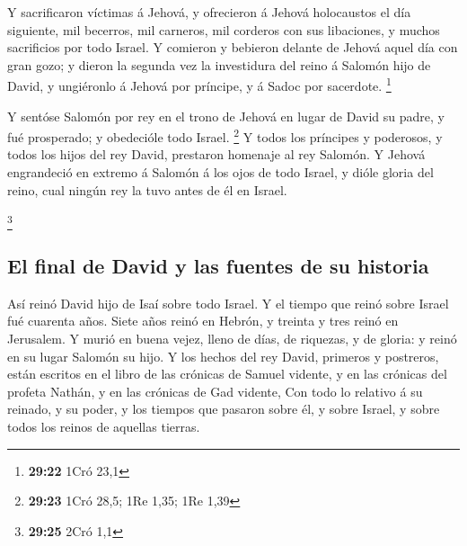  Y sacrificaron víctimas á Jehová, y ofrecieron á Jehová
holocaustos el día siguiente, mil becerros, mil carneros, mil corderos
con sus libaciones, y muchos sacrificios por todo Israel. 
Y comieron y bebieron delante de Jehová aquel día con gran gozo; y
dieron la segunda vez la investidura del reino á Salomón hijo de David,
y ungiéronlo á Jehová por príncipe, y á Sadoc por sacerdote. \footnote{\textbf{29:22}
  1Cró 23,1}

 Y sentóse Salomón por rey en el trono de Jehová en lugar
de David su padre, y fué prosperado; y obedecióle todo Israel.
\footnote{\textbf{29:23} 1Cró 28,5; 1Re 1,35; 1Re 1,39}  Y
todos los príncipes y poderosos, y todos los hijos del rey David,
prestaron homenaje al rey Salomón.  Y Jehová engrandeció en
extremo á Salomón á los ojos de todo Israel, y dióle gloria del reino,
cual ningún rey la tuvo antes de él en Israel.

\footnote{\textbf{29:25} 2Cró 1,1}

\hypertarget{el-final-de-david-y-las-fuentes-de-su-historia}{%
\subsection{El final de David y las fuentes de su
historia}\label{el-final-de-david-y-las-fuentes-de-su-historia}}

 Así reinó David hijo de Isaí sobre todo Israel.
 Y el tiempo que reinó sobre Israel fué cuarenta años.
Siete años reinó en Hebrón, y treinta y tres reinó en Jerusalem.
 Y murió en buena vejez, lleno de días, de riquezas, y de
gloria: y reinó en su lugar Salomón su hijo.  Y los hechos
del rey David, primeros y postreros, están escritos en el libro de las
crónicas de Samuel vidente, y en las crónicas del profeta Nathán, y en
las crónicas de Gad vidente,  Con todo lo relativo á su
reinado, y su poder, y los tiempos que pasaron sobre él, y sobre Israel,
y sobre todos los reinos de aquellas tierras.
